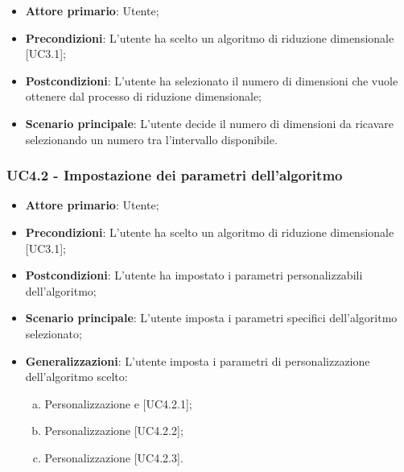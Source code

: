 \begin{itemize}
	\item \textbf{Attore primario}: Utente;
	
	\item \textbf{Precondizioni}: L'utente ha scelto un algoritmo di riduzione dimensionale [UC3.1];
	
	\item \textbf{Postcondizioni}: L'utente ha selezionato il numero di dimensioni che vuole ottenere dal processo di riduzione dimensionale;
	
	\item \textbf{Scenario principale}: L'utente decide il numero di dimensioni da ricavare selezionando un numero tra l'intervallo disponibile.
\end{itemize}		
	
\subsubsection{UC4.2 - Impostazione dei parametri dell'algoritmo}

\begin{itemize}
	\item \textbf{Attore primario}: Utente;
	
	\item \textbf{Precondizioni}: L'utente ha scelto un algoritmo di riduzione dimensionale [UC3.1];
	
	\item \textbf{Postcondizioni}: L'utente ha impostato i parametri personalizzabili dell'algoritmo;
	
	\item \textbf{Scenario principale}: L'utente imposta i parametri specifici dell'algoritmo selezionato;
	
		\item \textbf{Generalizzazioni}: L'utente imposta i parametri di personalizzazione dell'algoritmo scelto:
	\begin{enumerate}[(a)]
		\item Personalizzazione  e  [UC4.2.1];
		\item Personalizzazione  [UC4.2.2];
		\item Personalizzazione  [UC4.2.3].
	\end{enumerate}
\end{itemize}		
		


